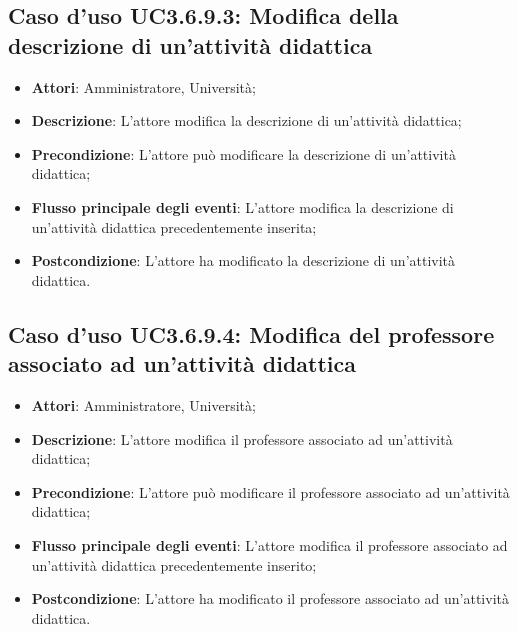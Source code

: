 \subsection{Caso d'uso \texorpdfstring{UC3.6.9.3}{UC3.6.9.3}: Modifica della descrizione di un'attività didattica}
\begin{itemize}
\item \textbf{Attori}: Amministratore, Università;
\item \textbf{Descrizione}: L'attore modifica la descrizione di un'attività didattica;

\item \textbf{Precondizione}: L'attore può modificare la descrizione di un'attività didattica;

\item \textbf{Flusso principale degli eventi}: L'attore modifica la descrizione di un'attività didattica precedentemente inserita;

\item \textbf{Postcondizione}: L'attore ha modificato la descrizione di un'attività didattica.

\end{itemize}
\subsection{Caso d'uso \texorpdfstring{UC3.6.9.4}{UC3.6.9.4}: Modifica del professore associato ad un'attività didattica}
\begin{itemize}
\item \textbf{Attori}: Amministratore, Università;
\item \textbf{Descrizione}: L'attore modifica il professore associato ad un'attività didattica;

\item \textbf{Precondizione}: L'attore può modificare il professore associato ad un'attività didattica;

\item \textbf{Flusso principale degli eventi}: L'attore modifica il professore associato ad un'attività didattica precedentemente inserito;

\item \textbf{Postcondizione}: L'attore ha modificato il professore associato ad un'attività didattica.

\end{itemize}
